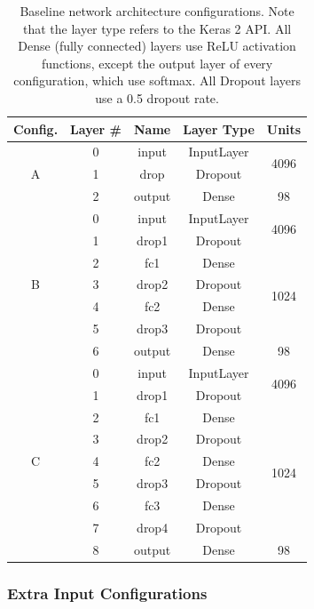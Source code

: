 \begin{table}[h!]
\begin{center}
\begin{tabular}{|c|c|c|c|c|}
\hline
\textbf{Config.} & \textbf{Layer \#} & \textbf{Name} & \textbf{Layer Type} & \textbf{Units} \\ \hline
\multirow{3}{*}{A} & 0 & input & InputLayer & \multirow{2}{*}{4096} \\ \cline{2-4}
 & 1 & drop & Dropout & \\ \cline{2-5}
 & 2 & output & Dense & 98 \\ \hline
\multirow{7}{*}{B} & 0 & input & InputLayer & \multirow{2}{*}{4096} \\ \cline{2-4}
 & 1 & drop1 & Dropout & \\ \cline{2-5}
 & 2 & fc1 & Dense & \multirow{4}{*}{1024} \\ \cline{2-4}
 & 3 & drop2 & Dropout & \\ \cline{2-4}
 & 4 & fc2 & Dense & \\ \cline{2-4}
 & 5 & drop3 & Dropout & \\ \cline{2-5}
 & 6 & output & Dense & 98 \\ \hline
\multirow{9}{*}{C} & 0 & input & InputLayer & \multirow{2}{*}{4096} \\ \cline{2-4}
 & 1 & drop1 & Dropout & \\ \cline{2-5}
 & 2 & fc1 & Dense & \multirow{6}{*}{1024} \\ \cline{2-4}
 & 3 & drop2 & Dropout & \\ \cline{2-4}
 & 4 & fc2 & Dense & \\ \cline{2-4}
 & 5 & drop3 & Dropout & \\ \cline{2-4}
 & 6 & fc3 & Dense & \\ \cline{2-4}
 & 7 & drop4 & Dropout & \\ \cline{2-5}
 & 8 & output & Dense & 98 \\ \hline
\end{tabular}
\end{center}
\caption[Baseline architecture configurations]{Baseline network architecture configurations. Note that the layer type refers to the Keras 2 API. All Dense (fully connected) layers use ReLU activation functions, except the output layer of every configuration, which use softmax. All Dropout layers use a 0.5 dropout rate.}
\label{tab:base-arch}
\end{table}

\subsubsection{Extra Input Configurations}

